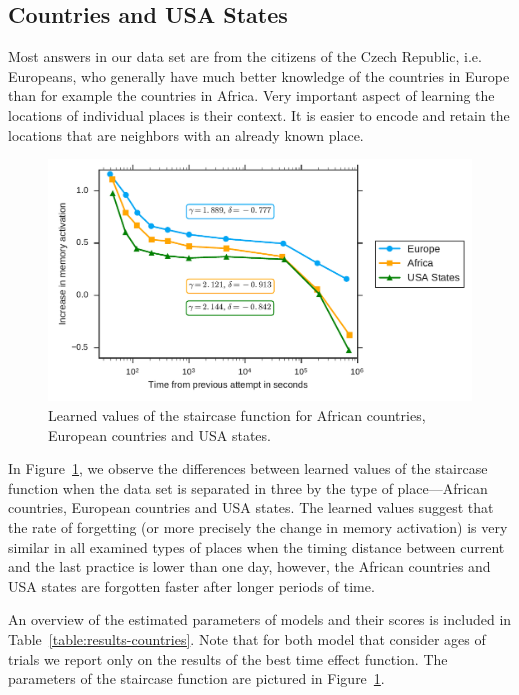 \subsection{Countries and USA States}

Most answers in our data set are from the citizens of the Czech Republic, i.e. Europeans, who generally have much better knowledge of the countries in Europe than for example the countries in Africa. Very important aspect of learning the locations of individual places is their context. It is easier to encode and retain the locations that are neighbors with an already known place.

\begin{figure}[htbp]
  \centering
  \includegraphics[width=\textwidth]{img/africa-europe-usa-states}
  \caption{Learned values of the staircase function for African countries, European countries and USA states.}
  \label{fig:africa-europe-usa-states}
\end{figure}

In Figure~\ref{fig:africa-europe-usa-states}, we observe the differences between learned values of the staircase function when the data set is separated in three by the type of place---African countries, European countries and USA states. The learned values suggest that the rate of forgetting (or more precisely the change in memory activation) is very similar in all examined types of places when the timing distance between current and the last practice is lower than one day, however, the African countries and USA states are forgotten faster after longer periods of time.

An overview of the estimated parameters of models and their scores is included in Table~\ref{table:results-countries}. Note that for both model that consider ages of trials we report only on the results of the best time effect function. The parameters of the staircase function are pictured in Figure~\ref{fig:africa-europe-usa-states}.

